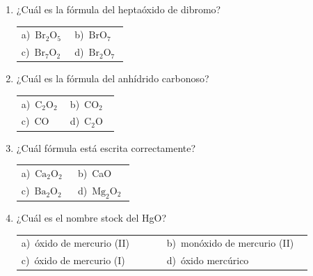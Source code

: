 \documentclass[11pt,a4paper]{article}
\begin{document}
\begin{enumerate}[label=\textbf{\arabic*.},leftmargin=*,itemsep=11pt,topsep=0pt]
\item \begin{minipage}[t]{\linewidth}
¿Cuál es la fórmula del heptaóxido de dibromo?

\vspace{5pt}
\begin{tabular}{@{}p{0.47\linewidth}p{0.47\linewidth}@{}}
a)~$\mathrm{Br_{2}O_{5}}$ & b)~$\mathrm{BrO_{7}}$ \\
c)~$\mathrm{Br_{7}O_{2}}$ & d)~$\mathrm{Br_{2}O_{7}}$ \\
\end{tabular}
\end{minipage}

\item \begin{minipage}[t]{\linewidth}
¿Cuál es la fórmula del anhídrido carbonoso?

\vspace{5pt}
\begin{tabular}{@{}p{0.47\linewidth}p{0.47\linewidth}@{}}
a)~$\mathrm{C_{2}O_{2}}$ & b)~$\mathrm{CO_{2}}$ \\
c)~CO & d)~$\mathrm{C_{2}O}$ \\
\end{tabular}
\end{minipage}

\item \begin{minipage}[t]{\linewidth}
¿Cuál fórmula está escrita correctamente?

\vspace{5pt}
\begin{tabular}{@{}p{0.47\linewidth}p{0.47\linewidth}@{}}
a)~$\mathrm{Ca_{2}O_{2}}$ & b)~CaO \\
c)~$\mathrm{Ba_{2}O_{2}}$ & d)~$\mathrm{Mg_{2}O_{2}}$ \\
\end{tabular}
\end{minipage}

\item \begin{minipage}[t]{\linewidth}
¿Cuál es el nombre stock del HgO?

\vspace{5pt}
\begin{tabular}{@{}p{0.47\linewidth}p{0.47\linewidth}@{}}
a)~óxido de mercurio (II) & b)~monóxido de mercurio (II) \\
c)~óxido de mercurio (I) & d)~óxido mercúrico \\
\end{tabular}
\end{minipage}


\end{enumerate}
\end{document}
